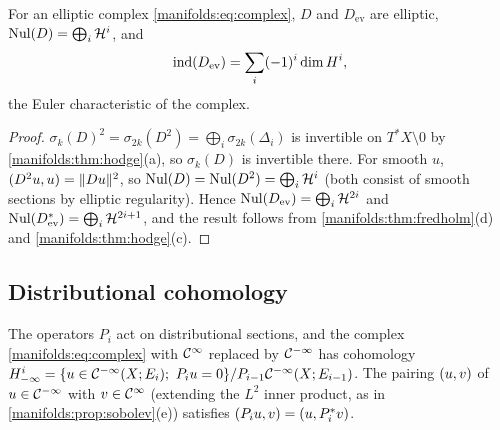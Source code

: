 \begin{corollary}\label{manifolds:cor:rolled-up}
For an elliptic complex \eqref{manifolds:eq:complex}, $D$ and $D_{\mathrm{ev}}$ are
elliptic, $\operatorname{Nul}(D)=\bigoplus_i\mathcal H^i$, and
\begin{equation*}
\operatorname{ind}(D_{\mathrm{ev}})=\sum_i(-1)^i\dim H^i ,
\end{equation*}
the Euler characteristic of the complex.
\end{corollary}
\begin{proof}
$\sigma_k(D)^2=\sigma_{2k}(D^2)=\bigoplus_i\sigma_{2k}(\Delta_i)$ is invertible on
$T^*X\setminus0$ by \cref{manifolds:thm:hodge}(a), so $\sigma_k(D)$ is invertible there. For
smooth $u$, $( D^2u, u)=\|Du\|^2$, so $\operatorname{Nul}(D)=\operatorname{Nul}(D^2)=\bigoplus_i\mathcal H^i$ (both
consist of smooth sections by elliptic regularity). Hence
$\operatorname{Nul}(D_{\mathrm{ev}})=\bigoplus_i\mathcal H^{2i}$ and $\operatorname{Nul}(D_{\mathrm{ev}}^*)=\bigoplus_i\mathcal H^{2i+1}$, and
the result follows from \cref{manifolds:thm:fredholm}(d) and
\cref{manifolds:thm:hodge}(c).
\end{proof}

\subsection{Distributional cohomology}
The operators $P_i$ act on distributional sections, and the complex
\eqref{manifolds:eq:complex} with $\mathcal{C}^\infty$ replaced by $\mathcal{C}^{-\infty}$ has cohomology
$H^i_{-\infty}=\{u\in\CmI(X;E_i);\ P_iu=0\}/P_{i-1}\CmI(X;E_{i-1})$. The pairing
$( u, v)$ of $u\in\mathcal{C}^{-\infty}$ with $v\in\mathcal{C}^\infty$ (extending the $L^2$ inner product, as in
\cref{manifolds:prop:sobolev}(e)) satisfies $( P_iu, v)=( u, P_i^*v)$.

